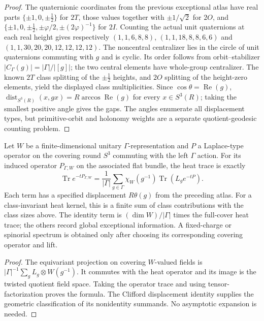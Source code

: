 \documentclass[11pt]{article}
\begin{document}
\begin{proof}
The quaternionic coordinates from the previous exceptional atlas have
real parts $\{\pm1,0,\pm\tfrac12\}$ for $2T$,
those values together with $\pm1/\sqrt2$ for $2O$, and
$\{\pm1,0,\pm\tfrac12,\pm\varphi/2,\pm(2\varphi)^{-1}\}$
for $2I$.  Counting the actual unit quaternions at each real height gives
respectively $(1,1,6,8,8)$, $(1,1,18,8,8,6,6)$ and
$(1,1,30,20,20,12,12,12,12)$.
The noncentral centralizer lies in the circle of unit quaternions commuting
with $g$ and is cyclic. Its order follows from orbit--stabilizer
$|C_\Gamma(g)|=|\Gamma|/|[g]|$; the two central elements have whole-group
centralizer.  The known $2T$ class splitting of the $\pm\tfrac12$ heights,
and $2O$ splitting of the height-zero elements, yield the displayed class
multiplicities.  Since $\cos\theta=\operatorname{Re}(g)$,
$\operatorname{dist}_{S^3(R)}(x,gx)=R\arccos\operatorname{Re}(g)$ for every
$x\in S^3(R)$; taking the smallest positive angle gives the gaps.
The angles enumerate all displacement types, but primitive-orbit and
holonomy weights are a separate quotient-geodesic counting problem.
\end{proof}

\begin{proposition}
\label{p1b:prop:v14-orbital-image-trace}
Let $W$ be a finite-dimensional unitary $\Gamma$-representation and $P$
a Laplace-type operator on the covering round $S^3$ commuting with the
left $\Gamma$ action. For its induced operator $P_{\Gamma,W}$ on the associated
flat bundle, the heat trace is exactly
\[
 \boxed{\operatorname{Tr}e^{-tP_{\Gamma,W}}
  =\frac1{|\Gamma|}\sum_{g\in\Gamma}
   \chi_W(g^{-1})\operatorname{Tr}(L_g e^{-tP})}. 
\]
Each term has a specified displacement $R\theta(g)$ from the preceding
atlas.  For a class-invariant heat kernel, this is a finite sum of class
contributions with the class sizes above.  The identity term is
$(\dim W)/|\Gamma|$ times the full-cover heat trace; the others record
global exceptional information. A fixed-charge or spinorial spectrum is
obtained only after choosing its corresponding covering operator and lift.
\end{proposition}
\begin{proof}
The equivariant projection on covering $W$-valued fields is
$|\Gamma|^{-1}\sum_g L_g\otimes W(g^{-1})$.  It commutes with the heat
operator and its image is the twisted quotient field space. Taking the
operator trace and using tensor-factorization proves the formula. The
Clifford displacement identity supplies the geometric classification of
its nonidentity summands.  No asymptotic expansion is needed.
\end{proof}
\end{document}
